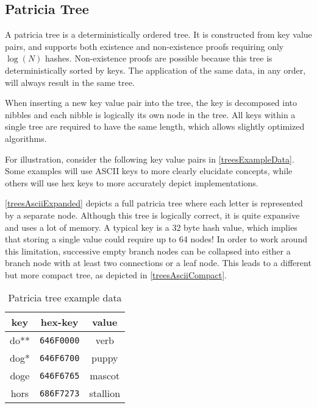 \subsection{Patricia Tree}

A patricia tree is a deterministically ordered tree.
It is constructed from key value pairs, and supports both existence and non-existence proofs requiring only $\log(N)$ hashes.
Non-existence proofs are possible because this tree is deterministically sorted by keys.
The application of the same data, in any order, will always result in the same tree.

When inserting a new key value pair into the tree, the key is decomposed into nibbles and each nibble is logically its own node in the tree.
All keys within a single tree are required to have the same length, which allows slightly optimized algorithms.

For illustration, consider the following key value pairs in \autoref{treesExampleData}.
Some examples will use ASCII keys to more clearly elucidate concepts, while others will use hex keys to more accurately depict \codenamespace implementations.

\autoref{treesAsciiExpanded} depicts a full patricia tree where each letter is represented by a separate node.
Although this tree is logically correct, it is quite expansive and uses a lot of memory.
A typical key is a 32 byte hash value, which implies that storing a single value could require up to 64 nodes!
In order to work around this limitation, successive empty branch nodes can be collapsed into either a branch node with at least two connections or a leaf node.
This leads to a different but more compact tree, as depicted in \autoref{treesAsciiCompact}.

\begin{table}[ht]
	\begin{center}
		\begin{tabular}{|c|c|c|}
			\hline
			key & hex-key & value \\
			\hline
			do** & \texttt{646F0000} & verb \\
			dog* & \texttt{646F6700} & puppy \\
			doge & \texttt{646F6765} & mascot \\
			hors & \texttt{686F7273} & stallion \\
			\hline
		\end{tabular}
		\caption{Patricia tree example data}
		\label{treesExampleData}
	\end{center}
\end{table}

